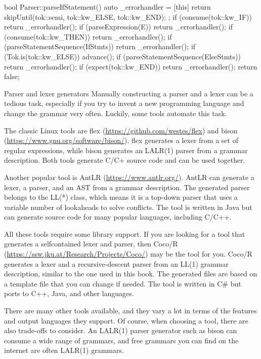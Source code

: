 \begin{cpp}
bool Parser::parseIfStatement() {
    auto _errorhandler = [this] {
        return skipUntil(tok::semi, tok::kw_ELSE, tok::kw_END);
    };
    if (consume(tok::kw_IF))
        return _errorhandler();
    if (parseExpression(E))
        return _errorhandler();
    if (consume(tok::kw_THEN))
        return _errorhandler();
    if (parseStatementSequence(IfStmts))
        return _errorhandler();
    if (Tok.is(tok::kw_ELSE)) {
        advance();
        if (parseStatementSequence(ElseStmts))
        return _errorhandler();
    }
    if (expect(tok::kw_END))
        return _errorhandler();
    return false;
}
\end{cpp}

\begin{myTip}{Parser and lexer generators}
Manually constructing a parser and a lexer can be a tedious task, especially if you try to invent a new programming language and change the grammar very often. Luckily, some tools automate this task.

The classic Linux tools are flex (\url{https://github.com/westes/flex}) and bison (\url{https://www.gnu.org/software/bison/}). flex generates a lexer from a set of regular expressions, while bison generates an LALR(1) parser from a grammar description.
Both tools generate C/C+ source code and can be used together.

Another popular tool is AntLR (\url{https://www.antlr.org/}). AntLR can generate a lexer, a parser, and an AST from a grammar description. The generated parser belongs to the LL(*) class, which means it is a top-down parser that uses a variable number of lookaheads to solve conflicts. The tool is written in Java but can generate source code for many popular languages, including C/C++.

All these tools require some library support. If you are looking for a tool that generates a selfcontained lexer and parser, then Coco/R (\url{https://ssw.jku.at/Research/Projects/Coco/}) may be the tool for you. Coco/R generates a lexer and a recursive-descent parser from an LL(1) grammar description, similar to the one used in this book. The generated files are based on a template file that you can change if needed. The tool is written in C\# but ports to C++, Java, and other languages.

There are many other tools available, and they vary a lot in terms of the features and output languages they support. Of course, when choosing a tool, there are also trade-offs to consider. An LALR(1) parser generator such as bison can consume a wide range of grammars, and free grammars you can find on the internet are often LALR(1) grammars.


\end{myTip}
